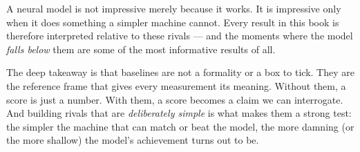 A neural model is not impressive merely because it works. It is
impressive only when it does something a simpler machine cannot. Every
result in this book is therefore interpreted relative to these rivals
--- and the moments where the model \emph{falls below} them are some of
the most informative results of all.

The deep takeaway is that baselines are not a formality or a box to
tick. They are the reference frame that gives every measurement its
meaning. Without them, a score is just a number. With them, a score
becomes a claim we can interrogate. And building rivals that are
\emph{deliberately simple} is what makes them a strong test: the simpler
the machine that can match or beat the model, the more damning (or the
more shallow) the model's achievement turns out to be.
